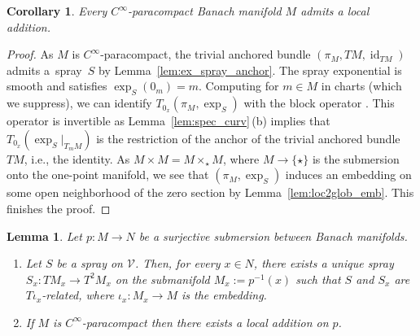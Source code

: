 \documentclass[pdftex]{sigma}
\numberwithin{equation}{section}
\newtheorem{Corollary}[Theorem]{Corollary}
\newtheorem{Lemma}[Theorem]{Lemma}
\newcommand{\cV}{\ensuremath{\mathcal{V}}}
\DeclareMathOperator{\id}{id}
\begin{document}
\begin{Corollary}\label{cor:exp_locadd}
Every $C^\infty$-paracompact Banach manifold $M$ admits a local addition.
\end{Corollary}
\begin{proof}\hspace{-1pt}As $M$ is $C^\infty$-paracompact, the trivial anchored bundle $(\pi_M,TM, \id_{TM})$ admits a~spray~$S$ by Lemma~\ref{lem:ex_spray_anchor}. The spray exponential is smooth and satisfies $\exp_S (0_m)=m$. Computing for $m\in M$ in charts (which we suppress), we can identify $T_{0_x} (\pi_M,\exp_S)$ with the block operator \smash{$\bigl[\begin{smallmatrix} \id & 0 \\ \star & T_{0_x} (\exp_S|_{T_mM})\end{smallmatrix}\bigr]$}. This operator is invertible as Lemma~\ref{lem:spec_curv}\,(b) implies that $T_{0_x} (\exp_S|_{T_mM})$ is the restriction of the anchor of the trivial anchored bundle~$TM$, i.e., the identity. As $M\times M = M\times_{\star} M$, where $M\rightarrow \{\star\}$ is the submersion onto the one-point manifold, we see that $(\pi_M,\exp_S)$ induces an embedding on some open neighborhood of the zero section by Lemma~\ref{lem:loc2glob_emb}. This finishes the proof.
\end{proof}

\begin{Lemma}\label{lem:con_loc_add_subm}
Let $p\colon M \rightarrow N$ be a surjective submersion between Banach manifolds.
\begin{enumerate}\itemsep=0pt
\item[\textup{(a)}] Let $S$ be a spray on $\cV$.
Then, for every $x \in N$, there exists a unique spray ${S_{x}\colon\! TM_{x}\! \rightarrow\! T^{2}M_{x}}$ on the submanifold $M_x := p^{-1}(x)$ such that $S$ and $S_x$ are $T\iota_x$-related, where $\iota_x \colon M_x \rightarrow M$ is the embedding.
\item[\textup{(b)}] If $M$ is $C^\infty$-paracompact then there exists a local addition on $p$.
\end{enumerate}
\end{Lemma}
\end{document}
